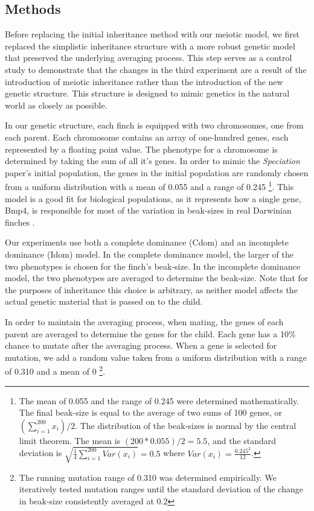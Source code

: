 \documentclass{article}
\begin{document}
\subsection{Methods}

Before replacing the initial inheritance method with our meiotic model, we first replaced the simplistic inheritance structure with a more robust genetic model that preserved the underlying averaging process. This step serves as a control study to demonstrate that the changes in the third experiment are a result of the introduction of meiotic inheritance rather than the introduction of the new genetic structure. This structure is designed to mimic genetics in the natural world as closely as possible. 

In our genetic structure, each finch is equipped with two chromosomes, one from each parent. Each chromosome contains an array of one-hundred genes, each represented by a floating point value. The phenotype for a chromosome is determined by taking the sum of all it's genes. In order to mimic the \textit{Speciation} paper’s initial population, the genes in the initial population are randomly chosen from a uniform distribution with a mean of 0.055 and a range of 0.245 \footnote{The mean of 0.055 and the range of 0.245 were determined mathematically. The final beak-size is equal to the average of two sums of 100 genes, or $(\sum_{i=1}^{200} x_{i})/2$. The distribution of the beak-sizes is normal by the central limit theorem. The mean is $(200 * 0.055)/2 = 5.5$, and the standard deviation is $\sqrt{\frac{1}{4}\sum_{i=1}^{200}Var(x_{i})} = 0.5$ where $Var(x_{i}) = \frac{0.245^2}{12}$.}. This model is a good fit for biological populations, as it represents how a single gene, Bmp4, is responsible for most of the variation in beak-sizes in real Darwinian finches \cite{BMP4}. 

Our experiments use both a complete dominance (Cdom) and an incomplete dominance (Idom) model. In the complete dominance model, the larger of the two phenotypes is chosen for the finch's beak-size. In the incomplete dominance model, the two phenotypes are averaged to determine the beak-size. Note that for the purposes of inheritance this choice is arbitrary, as neither model affects the actual genetic material that is passed on to the child. 

In order to maintain the averaging process, when mating, the genes of each parent are averaged to determine the genes for the child. Each gene has a 10\% chance to mutate after the averaging process. When a gene is selected for mutation, we add a random value taken from a uniform distribution with a range of 0.310 and a mean of 0 \footnote{The running mutation range of 0.310 was determined empirically. We iteratively tested mutation ranges until the standard deviation of the change in beak-size consistently averaged at 0.2}.
\end{document}

